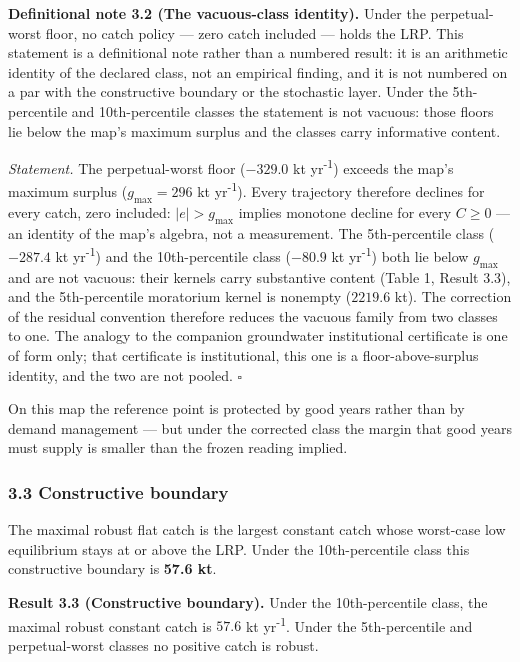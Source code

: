 \documentclass[11pt]{article}
\begin{document}
\textbf{Definitional note 3.2 (The vacuous-class identity).} Under the
perpetual-worst floor, no catch policy --- zero catch included --- holds
the LRP. This statement is a definitional note rather than a numbered
result: it is an arithmetic identity of the declared class, not an
empirical finding, and it is not numbered on a par with the constructive
boundary or the stochastic layer. Under the 5th-percentile and
10th-percentile classes the statement is not vacuous: those floors lie
below the map's maximum surplus and the classes carry informative
content.

\emph{Statement.} The perpetual-worst floor (\(-329.0\) kt yr\textsuperscript{-1}) exceeds
the map's maximum surplus (\(g_{\max} = 296\) kt yr\textsuperscript{-1}). Every trajectory
therefore declines for every catch, zero included: \(|e| > g_{\max}\)
implies monotone decline for every \(C \ge 0\) --- an identity of the
map's algebra, not a measurement. The 5th-percentile class (\(-287.4\)
kt yr\textsuperscript{-1}) and the 10th-percentile class (\(-80.9\) kt yr\textsuperscript{-1}) both lie
below \(g_{\max}\) and are not vacuous: their kernels carry substantive
content (Table 1, Result 3.3), and the 5th-percentile moratorium kernel
is nonempty (\(2219.6\) kt). The correction of the residual convention
therefore reduces the vacuous family from two classes to one. The
analogy to the companion groundwater institutional certificate is one of
form only; that certificate is institutional, this one is a
floor-above-surplus identity, and the two are not pooled. \ensuremath{\square}

On this map the reference point is protected by good years rather than
by demand management --- but under the corrected class the margin that
good years must supply is smaller than the frozen reading implied.

\subsubsection{3.3 Constructive boundary}\label{constructive-boundary}

The maximal robust flat catch is the largest constant catch whose
worst-case low equilibrium stays at or above the LRP. Under the
10th-percentile class this constructive boundary is \textbf{57.6 kt}.

\textbf{Result 3.3 (Constructive boundary).} Under the 10th-percentile
class, the maximal robust constant catch is \(57.6\) kt yr\textsuperscript{-1}. Under the
5th-percentile and perpetual-worst classes no positive catch is robust.
\end{document}
